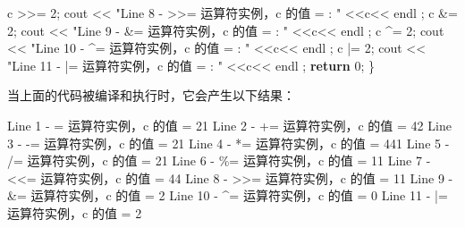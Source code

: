 \documentclass[
]{article}
\newenvironment{Shaded}{}{}
\newcommand{\ControlFlowTok}[1]{\textcolor[rgb]{0.00,0.44,0.13}{\textbf{#1}}}
\newcommand{\DecValTok}[1]{\textcolor[rgb]{0.25,0.63,0.44}{#1}}
\newcommand{\NormalTok}[1]{#1}
\newcommand{\OperatorTok}[1]{\textcolor[rgb]{0.40,0.40,0.40}{#1}}
\newcommand{\StringTok}[1]{\textcolor[rgb]{0.25,0.44,0.63}{#1}}
\begin{document}
\begin{Shaded}
\begin{Highlighting}[]
\NormalTok{   c }\OperatorTok{\textgreater{}\textgreater{}=}  \DecValTok{2}\OperatorTok{;}\NormalTok{   cout }\OperatorTok{\textless{}\textless{}} \StringTok{"Line 8 {-} \textgreater{}\textgreater{}= 运算符实例，c 的值 = : "} \OperatorTok{\textless{}\textless{}}\NormalTok{c}\OperatorTok{\textless{}\textless{}}\NormalTok{ endl }\OperatorTok{;} 
\NormalTok{   c }\OperatorTok{\&=}  \DecValTok{2}\OperatorTok{;}\NormalTok{   cout }\OperatorTok{\textless{}\textless{}} \StringTok{"Line 9 {-} \&= 运算符实例，c 的值 = : "} \OperatorTok{\textless{}\textless{}}\NormalTok{c}\OperatorTok{\textless{}\textless{}}\NormalTok{ endl }\OperatorTok{;} 
\NormalTok{   c }\OperatorTok{\^{}=}  \DecValTok{2}\OperatorTok{;}\NormalTok{   cout }\OperatorTok{\textless{}\textless{}} \StringTok{"Line 10 {-} \^{}= 运算符实例，c 的值 = : "} \OperatorTok{\textless{}\textless{}}\NormalTok{c}\OperatorTok{\textless{}\textless{}}\NormalTok{ endl }\OperatorTok{;} 
\NormalTok{   c }\OperatorTok{|=}  \DecValTok{2}\OperatorTok{;}\NormalTok{   cout }\OperatorTok{\textless{}\textless{}} \StringTok{"Line 11 {-} |= 运算符实例，c 的值 = : "} \OperatorTok{\textless{}\textless{}}\NormalTok{c}\OperatorTok{\textless{}\textless{}}\NormalTok{ endl }\OperatorTok{;} 
   \ControlFlowTok{return} \DecValTok{0}\OperatorTok{;}
\OperatorTok{\}}
\end{Highlighting}
\end{Shaded}

当上面的代码被编译和执行时，它会产生以下结果：

\begin{Shaded}
\begin{Highlighting}[]
\NormalTok{Line }\DecValTok{1} \OperatorTok{{-}} \OperatorTok{=}\NormalTok{  运算符实例，c 的值 }\OperatorTok{=} \DecValTok{21}
\NormalTok{Line }\DecValTok{2} \OperatorTok{{-}} \OperatorTok{+=}\NormalTok{ 运算符实例，c 的值 }\OperatorTok{=} \DecValTok{42}
\NormalTok{Line }\DecValTok{3} \OperatorTok{{-}} \OperatorTok{{-}=}\NormalTok{ 运算符实例，c 的值 }\OperatorTok{=} \DecValTok{21}
\NormalTok{Line }\DecValTok{4} \OperatorTok{{-}} \OperatorTok{*=}\NormalTok{ 运算符实例，c 的值 }\OperatorTok{=} \DecValTok{441}
\NormalTok{Line }\DecValTok{5} \OperatorTok{{-}} \OperatorTok{/=}\NormalTok{ 运算符实例，c 的值 }\OperatorTok{=} \DecValTok{21}
\NormalTok{Line }\DecValTok{6} \OperatorTok{{-}} \OperatorTok{\%=}\NormalTok{ 运算符实例，c 的值 }\OperatorTok{=} \DecValTok{11}
\NormalTok{Line }\DecValTok{7} \OperatorTok{{-}} \OperatorTok{\textless{}\textless{}=}\NormalTok{ 运算符实例，c 的值 }\OperatorTok{=} \DecValTok{44}
\NormalTok{Line }\DecValTok{8} \OperatorTok{{-}} \OperatorTok{\textgreater{}\textgreater{}=}\NormalTok{ 运算符实例，c 的值 }\OperatorTok{=} \DecValTok{11}
\NormalTok{Line }\DecValTok{9} \OperatorTok{{-}} \OperatorTok{\&=}\NormalTok{ 运算符实例，c 的值 }\OperatorTok{=} \DecValTok{2}
\NormalTok{Line }\DecValTok{10} \OperatorTok{{-}} \OperatorTok{\^{}=}\NormalTok{ 运算符实例，c 的值 }\OperatorTok{=} \DecValTok{0}
\NormalTok{Line }\DecValTok{11} \OperatorTok{{-}} \OperatorTok{|=}\NormalTok{ 运算符实例，c 的值 }\OperatorTok{=} \DecValTok{2}
\end{Highlighting}
\end{Shaded}
\end{document}
